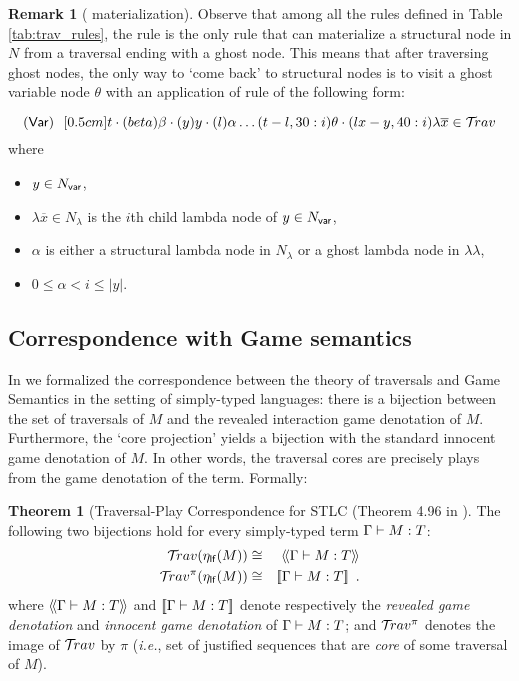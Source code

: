 \documentclass{article}
\makeatletter
\theoremstyle{definition}
\newtheorem{remark}{Remark}[section]
\newtheorem{theorem}{Theorem}[section]
\newcommand\Nodes{N}%
\newcommand\NodesVar{N_{\sf var}}%
\newcommand\NodesLmd{N_\lambda}%
\newcommand{\ghostlmd}{{\lambda\!\!\lambda}}
\newcommand{\ghostvar}{\theta}
\newcommand{\travulc}{\travset}
\def\coresymbol{\pi} %
\renewcommand\ie{{\it i.e.\@\xspace}}
\makeatother
\begin{document}
\begin{remark}[ materialization]
Observe that among all the rules defined in Table \ref{tab:trav_rules}, the rule  is the only rule that can materialize a structural node in $\Nodes$ from a traversal ending with a ghost node. This means that after traversing ghost nodes, the only way to `come back' to structural nodes is to visit a ghost variable node $\ghostvar$ with an application of rule  of the following form:

$$\rulename{Var}\ \  \Pstr[0.5cm]{ t \cdot(beta){\beta} \cdot
(y){y} \cdot (l){\alpha}  \ldots (t-l,30:i){\ghostvar}
    \cdot (lx-y,40:i){\lambda \overline{x}}
     \in\travulc}$$
where
\begin{itemize}
\item $y \in \NodesVar$,
\item $\lambda \overline{x} \in \NodesLmd$ is the $i$th child lambda node of $y \in \NodesVar$,
\item $\alpha$ is either a structural lambda node in $\Nodes_\lambda$ or a ghost lambda node in $\ghostlmd$,
\item $0\leq \alpha < i \leq |y|$.
\end{itemize}
\end{remark}

\subsection{Correspondence with Game semantics}
\label{sec:traversal_correspondence_stlc}

In \cite{BlumPhd} we formalized the correspondence between the theory of traversals and Game Semantics in the setting of simply-typed languages: there is a bijection between the set of traversals of $M$ and the revealed interaction game denotation of $M$. Furthermore, the `core projection' yields a bijection with the standard innocent game denotation of $M$.
In other words, the traversal cores are precisely plays from the game denotation of the term.
Formally:
\begin{theorem}[Traversal-Play Correspondence for STLC (Theorem 4.96 in \cite{BlumPhd}]
\label{thm:gamesem_correspondence_stlc}
The following two bijections hold for every simply-typed term $\Gamma \vdash M :T$:
\begin{eqnarray*}
 \travulc(\etalf{M}) & \cong & \revsem{\Gamma \entail M :T} \\
 \travulc^\coresymbol(\etalf{M}) & \cong & \sem{\Gamma \entail M :T} \enspace .
\end{eqnarray*}
where ${\langle\!\langle \Gamma \vdash M : T \rangle\!\rangle}$ and
${[\![ \Gamma \vdash M : T ]\!]}$
denote respectively the \emph{revealed game denotation} and \emph{innocent game denotation} of
$\Gamma \vdash M : T$;
and $\travulc^\coresymbol$ denotes the image of $\travulc$ by $\coresymbol$ (\ie, set of justified sequences that are \emph{core} of some traversal of $M$).
\end{theorem}
\end{document}
